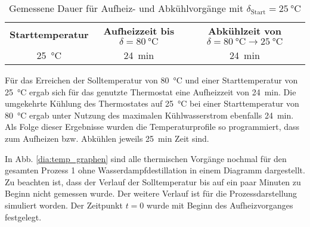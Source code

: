 \begin{table}[h!]
	\renewcommand*{\arraystretch}{1.2}
	\centering
	\caption[Gemessene Dauer für Aufheiz- und Abkühlvorgänge]{Gemessene Dauer für Aufheiz- und Abkühlvorgänge mit $\delta_{\text{Start}}=\SI{25}{\celsius}$}
	\label{tab:zeiten}
	\begin{tabulary}{1.1\textwidth}{C|C|C}
		\hline
		\textbf{Starttemperatur}&\textbf{Aufheizzeit bis $\delta=\SI{80}{\celsius}$} & \textbf{Abkühlzeit von $\delta=\SI{80}{\celsius}\rightarrow\SI{25}{\celsius}$}\\
		\SI{25}{\celsius} & \SI{24}{\minute} & \SI{24}{\minute}\\
		\hline			
	\end{tabulary}
\end{table}%
\FloatBarrier
Für das Erreichen der Solltemperatur von \SI{80}{\celsius} und einer Starttemperatur von \SI{25}{\celsius} ergab sich für das genutzte Thermostat eine Aufheizzeit von \SI{24}{\minute}. Die umgekehrte Kühlung des Thermostates auf \SI{25}{\celsius} bei einer Starttemperatur von \SI{80}{\celsius} ergab unter Nutzung des maximalen Kühlwasserstrom ebenfalls \SI{24}{\minute}. \\
Als Folge dieser Ergebnisse wurden die Temperaturprofile so programmiert, dass zum Aufheizen bzw. Abkühlen jeweils \SI{25}{\minute} Zeit sind. 

In Abb. \ref{dia:temp_graphen} sind alle thermischen Vorgänge nochmal für den gesamten Prozess 1 ohne Wasserdampfdestillation in einem Diagramm dargestellt.
Zu beachten ist, dass der Verlauf der Solltemperatur bis auf ein paar Minuten zu Beginn nicht gemessen wurde. Der weitere Verlauf ist für die Prozessdarstellung simuliert worden. Der Zeitpunkt $t=0$ wurde mit Beginn des Aufheizvorganges festgelegt.

